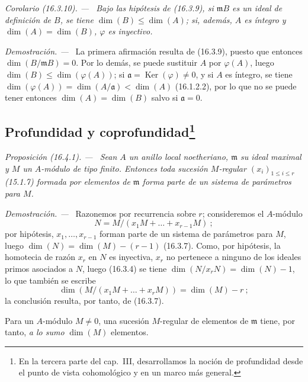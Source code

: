 \documentclass[10pt,oneside]{book}
\makeatletter
\newcommand{\setmanualcurrentlabel}[1]{\def\@currentlabel{#1}}
\newenvironment{proposition}[1][]{%
  \setmanualcurrentlabel{#1}\par\medskip\noindent\itshape Proposición (#1). ---\ }{\par}
\newenvironment{corollary}[1][]{%
  \setmanualcurrentlabel{#1}\par\medskip\noindent\itshape Corolario (#1). ---\ }{\par}
\newenvironment{proof}{%
  \par\medskip\noindent\textit{Demostración. ---\ }}{\par}
\makeatother
\begin{document}
\begin{corollary}[16.3.10]
\label{0.16.3.10-es}
Bajo las hipótesis de (16.3.9), si $\mathfrak{m}B$ es un ideal de definición
de $B$, se tiene $\dim(B)\leq\dim(A)$; si, además, $A$ es íntegro y
$\dim(A)=\dim(B)$, $\varphi$ es inyectivo.
\end{corollary}

\begin{proof}
La primera afirmación resulta de (16.3.9), puesto que entonces
$\dim(B/\mathfrak{m}B)=0$. Por lo demás, se puede sustituir $A$ por
$\varphi(A)$, luego $\dim(B)\leq\dim(\varphi(A))$; si
$\mathfrak{a}=\operatorname{Ker}(\varphi)\neq0$, y si $A$ es íntegro, se tiene
$\dim(\varphi(A))=\dim(A/\mathfrak{a})<\dim(A)$ (16.1.2.2), por lo que no se
puede tener entonces $\dim(A)=\dim(B)$ salvo si $\mathfrak{a}=0$.
\end{proof}

\subsection[Profundidad y coprofundidad]{Profundidad y
coprofundidad\protect\footnote{En la tercera parte del cap.~III, desarrollamos
la noción de profundidad desde el punto de vista cohomológico y en un marco
más general.}}
\label{subsection:0.16.4-es}

\begin{proposition}[16.4.1]
\label{0.16.4.1-es}
Sean $A$ un anillo local noetheriano, $\mathfrak{m}$ su ideal maximal y $M$ un
$A$-módulo de tipo finito. Entonces toda sucesión $M$-regular
$(x_i)_{1\leq i\leq r}$ (15.1.7) formada por elementos de $\mathfrak{m}$ forma
parte de un sistema de parámetros para $M$.
\end{proposition}

\begin{proof}
Razonemos por recurrencia sobre $r$; consideremos el $A$-módulo
\[
  N=M/(x_1M+\ldots+x_{r-1}M)~;
\]
por hipótesis, $x_1,\ldots,x_{r-1}$ forman parte de un sistema de parámetros
para $M$, luego $\dim(N)=\dim(M)-(r-1)$ (16.3.7). Como, por hipótesis, la
homotecia de razón $x_r$ en $N$ es inyectiva, $x_r$ no pertenece a ninguno de
los ideales primos asociados a $N$, luego (16.3.4) se tiene
$\dim(N/x_rN)=\dim(N)-1$, lo que también se escribe
\[
  \dim(M/(x_1M+\ldots+x_rM))=\dim(M)-r~;
\]
la conclusión resulta, por tanto, de (16.3.7).
\end{proof}

Para un $A$-módulo $M\neq0$, una sucesión $M$-regular de elementos de
$\mathfrak{m}$ tiene, por tanto, \emph{a lo sumo} $\dim(M)$ elementos.
\end{document}

